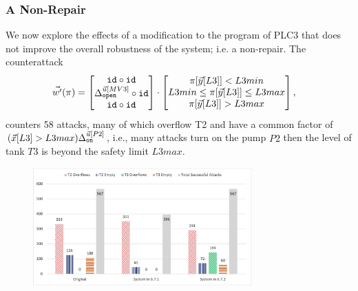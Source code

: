 {%
 
\subsubsection{A Non-Repair} 
\label{sec:CPSRobustness:NonRepair} We now explore the effects of a modification to the program of PLC3 that does not improve the overall robustness of the system; i.e. a non-repair. The counterattack 
\begin{align*}
    \vec{w'}(\pi)&=
    \begin{bmatrix}
     {\texttt{id}}\circ {\texttt{id}} \\
     {\Delta}^{\vec{u}[MV3]}_{\texttt{open}}\circ {\texttt{id}} \\
     {\texttt{id}}\circ {\texttt{id}} \\
    \end{bmatrix}
    \cdot
    \begin{bmatrix}
      \pi[\vec{y}[L3]]<L3min \\
      L3min \leq \pi[\vec{y}[L3]]\leq L3max \\
      \pi[\vec{y}[L3]]>L3max
    \end{bmatrix},
  \end{align*} 
counters 58 attacks, many of which overflow T2 and have a common factor of $(\vec{x}[L3]>L3max){\Delta}^{\vec{u}[P2]}_{\texttt{on}}$, i.e., many attacks turn on the pump $P2$ then the level of tank $T3$ is beyond the safety limit $L3max$. 
\begin{figure}[t]
  \centering
  \includegraphics[width=0.75\textwidth]{Figures/AttackDistribution.png} 

\end{figure}}
